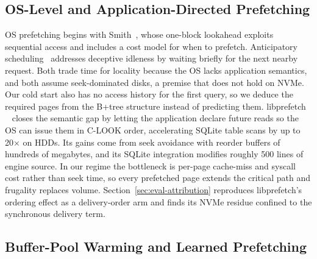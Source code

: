 \documentclass[sigconf, nonacm]{acmart}
\begin{document}
\subsection{OS-Level and Application-Directed Prefetching}\label{sec:os-prefetch}

OS prefetching begins with Smith~\cite{Smith1978}, whose one-block lookahead exploits sequential access and includes a cost model for when to prefetch. Anticipatory scheduling~\cite{Iyer2001} addresses deceptive idleness by waiting briefly for the next nearby request. Both trade time for locality because the OS lacks application semantics, and both assume seek-dominated disks, a premise that does not hold on NVMe. Our cold start also has no access history for the first query, so we deduce the required pages from the B+tree structure instead of predicting them. libprefetch ~\cite{VanDeBogart2009} closes the semantic gap by letting the application declare future reads so the OS can issue them in C-LOOK order, accelerating SQLite table scans by up to 20× on HDDs. Its gains come from seek avoidance with reorder buffers of hundreds of megabytes, and its SQLite integration modifies roughly 500 lines of engine source. In our regime the bottleneck is per-page cache-miss and syscall cost rather than seek time, so every prefetched page extends the critical path and frugality replaces volume. Section~\ref{sec:eval-attribution} reproduces libprefetch's ordering effect as a delivery-order arm and finds its NVMe residue confined to the synchronous delivery term.

\subsection{Buffer-Pool Warming and Learned Prefetching}\label{sec:buffer-warming}
\end{document}
